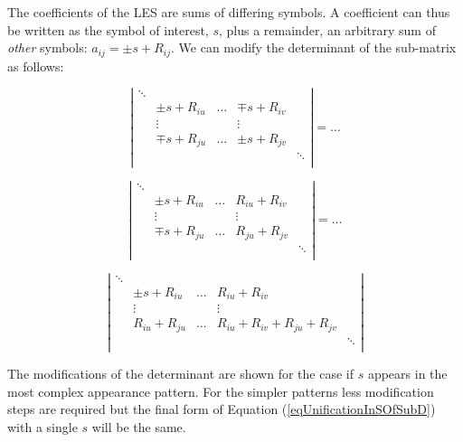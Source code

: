 The coefficients of the LES are sums of differing symbols. A coefficient
can thus be written as the symbol of interest, $s$, plus a remainder, an
arbitrary sum of \emph{other} symbols: $a_{ij} = \pm s + R_{ij}$. We can
modify the determinant of the sub-matrix as follows:

\begin{displaymath}
\left|
\begin{array}{ccccc}
\ddots & & & & \\
 & \pm s + R_{iu} & \ldots & \mp s + R_{iv} & \\
 & \vdots & & \vdots & \\
 & \mp s + R_{ju} & \ldots & \pm s + R_{jv} & \\
 & & & & \ddots \\
\end{array}
\right| = \ldots
\end{displaymath}

\begin{displaymath}
\left|
\begin{array}{ccccc}
\ddots & & & & \\
 & \pm s + R_{iu} & \ldots & R_{iu} + R_{iv} & \\
 & \vdots & & \vdots & \\
 & \mp s + R_{ju} & \ldots & R_{ju} + R_{jv} & \\
 & & & & \ddots \\
\end{array}
\right| = \ldots
\end{displaymath}

\begin{equation}
\label{eqUnificationInSOfSubD}
\left|
\begin{array}{ccccc}
\ddots & & & & \\
 & \pm s + R_{iu}  & \ldots & R_{iu} + R_{iv}                   & \\
 & \vdots & & \vdots & \\
 & R_{iu} + R_{ju} & \ldots & R_{iu} + R_{iv} + R_{ju} + R_{jv} & \\
 & & & & \ddots \\
\end{array}
\right|
\end{equation}

The modifications of the determinant are shown for the case if
$s$ appears in the most complex appearance pattern. For the simpler
patterns less modification steps are required but the final form of
Equation (\ref{eqUnificationInSOfSubD}) with a single $s$ will be the same.

